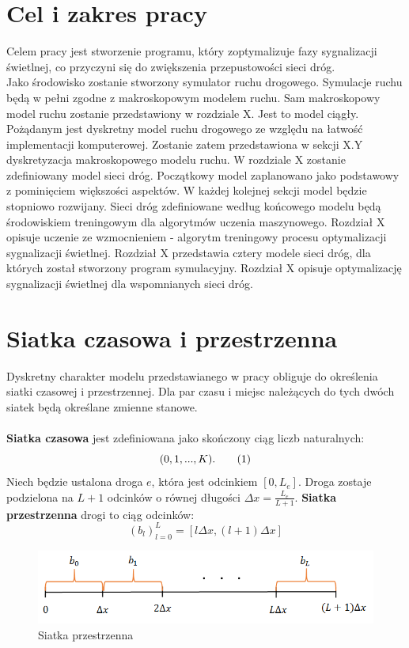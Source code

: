 \documentclass[12pt]{book}
\theoremstyle{plain}
\newcommand\addtag{\refstepcounter{equation}
\renewcommand{\labelenumii}{\theenumii}
\renewcommand{\theenumii}{\theenumi.\arabic{enumii}.}
\tag{\theequation}}
\begin{document}
\chapter{Cel i zakres pracy}
Celem pracy jest stworzenie programu, który zoptymalizuje fazy sygnalizacji świetlnej, co przyczyni się do zwiększenia przepustowości sieci dróg.\\ Jako środowisko zostanie stworzony symulator ruchu drogowego. Symulacje ruchu będą w pełni zgodne z makroskopowym modelem ruchu. Sam makroskopowy model ruchu zostanie przedstawiony w rozdziale X. Jest to model ciągły. Pożądanym jest dyskretny model ruchu drogowego ze względu na łatwość implementacji komputerowej. Zostanie zatem przedstawiona w sekcji X.Y dyskretyzacja makroskopowego modelu ruchu. W rozdziale X zostanie zdefiniowany model sieci dróg. Początkowy model zaplanowano jako podstawowy z pominięciem większości aspektów. W każdej kolejnej sekcji model będzie stopniowo rozwijany. Sieci dróg zdefiniowane według końcowego modelu będą środowiskiem treningowym dla algorytmów uczenia maszynowego. Rozdział X opisuje uczenie ze wzmocnieniem - algorytm treningowy procesu optymalizacji sygnalizacji świetlnej. Rozdział X przedstawia cztery modele sieci dróg, dla których został stworzony program symulacyjny. Rozdział X opisuje optymalizację sygnalizacji świetlnej dla wspomnianych sieci dróg.


   
\chapter{Siatka czasowa i przestrzenna}
Dyskretny charakter modelu przedstawianego w pracy obliguje do określenia siatki czasowej i przestrzennej. Dla par czasu i miejsc należących do tych dwóch siatek będą określane zmienne stanowe. \\ \\ \textbf{Siatka czasowa} jest zdefiniowana jako skończony ciąg liczb naturalnych:
\[(0,1,...,K). \addtag \]
Niech będzie ustalona droga $e$, która jest odcinkiem $[0,L_e]$. Droga zostaje podzielona na $L+1$ odcinków o równej długości $\Delta x=\frac{L_e}{L+1}$. \textbf{Siatka przestrzenna} drogi to ciąg odcinków:
\[(b_l)_{l=0}^{L}=[l\Delta x,(l+1)\Delta x]\]
\begin{figure}[H]
  \centering
    \includegraphics[width=14cm]{siatka_przestrzenna}
 \caption{Siatka przestrzenna}
 \label{fig:siatka_przestrzenna}
\end{figure}
\end{document}
